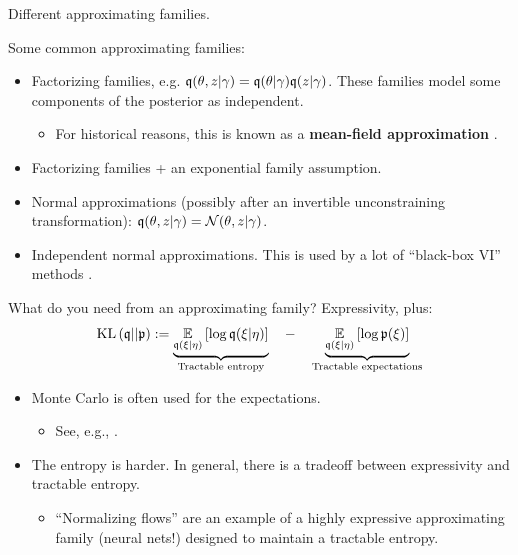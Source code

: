 \begin{frame}{Different approximating families.}

Some common approximating families:
%
\begin{itemize}
%
\item Factorizing families, e.g.
$\mathfrak{q}(\theta, z \vert \gamma) = \mathfrak{q}(\theta \vert
\gamma) \mathfrak{q}(z \vert \gamma)$.  These families model some components
of the posterior as independent.
\begin{itemize}
\item For historical reasons, this is known as a
\textbf{mean-field approximation} \citep{wainwright2008graphical}.
\end{itemize}
%
\item Factorizing families + an exponential family assumption.
%
\item Normal approximations (possibly after an invertible
unconstraining transformation): $\mathfrak{q}(\theta, z \vert \gamma) =
\mathcal{N}(\theta, z | \gamma)$.
%
\item Independent normal approximations.  This is used by a lot of
``black-box VI'' methods \citep{ranganath2014black, kucukelbir2017automatic}.
%
\end{itemize}
%
\pause

\hrulefill

What do you need from an approximating family?  Expressivity, plus:
%
\begin{align*}
%
\kl{\q}{\p} :=
\underbrace{
    \expect{\q(\xi | \eta)}{\log \q(\xi | \eta)}
}_{\textrm{Tractable entropy}}
\quad     - \quad
\underbrace{
    \expect{\q(\xi | \eta)}{\log \p(\xi)}
}_{\textrm{Tractable expectations}}
%
\end{align*}
%

\pause

\begin{itemize}
\item Monte Carlo is often used for the expectations.
\begin{itemize}
    \item See, e.g., \citet{ranganath2014black}.
\end{itemize}

\item The entropy is harder.  In general, there is a tradeoff between expressivity
and tractable entropy.
\begin{itemize}
\item ``Normalizing flows'' are an example of a highly expressive approximating
family (neural nets!) designed to maintain a tractable entropy.
\citep{rezende2015variational}
\end{itemize}
\end{itemize}



\end{frame}
